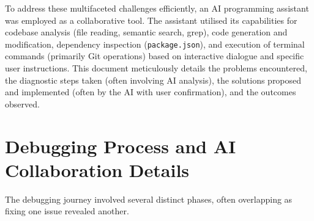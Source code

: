 \documentclass[11pt]{article} %
\begin{document}
To address these multifaceted challenges efficiently, an AI programming assistant was employed as a collaborative tool. The assistant utilised its capabilities for codebase analysis (file reading, semantic search, grep), code generation and modification, dependency inspection (\texttt{package.json}), and execution of terminal commands (primarily Git operations) based on interactive dialogue and specific user instructions. This document meticulously details the problems encountered, the diagnostic steps taken (often involving AI analysis), the solutions proposed and implemented (often by the AI with user confirmation), and the outcomes observed.

\section{Debugging Process and AI Collaboration Details}

The debugging journey involved several distinct phases, often overlapping as fixing one issue revealed another.
\end{document}
